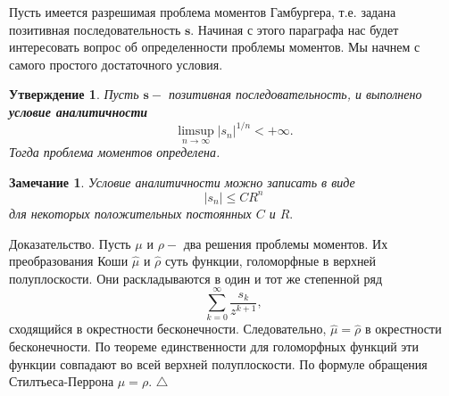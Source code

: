 \documentclass[12pt,a4paper]{article}
\theoremstyle{plain}   \newtheorem{Pro}{Задача}
\newtheorem{Sta}{Утверждение}
\newtheorem{Rem}{Замечание}
\begin{document}
Пусть имеется разрешимая проблема моментов Гамбургера, т.е.
задана позитивная последовательность
$ \mathbf{s} . $
Начиная с этого параграфа нас будет интересовать вопрос об
определенности проблемы моментов. Мы начнем с самого простого
достаточного условия.
\begin{Sta}
Пусть
$ \mathbf{s} - $
позитивная последовательность, и выполнено
{\bfseries условие аналитичности}
$$
  \limsup _{n \rightarrow \infty }
  |s_n |^{1/n} < + \infty .
$$
Тогда проблема моментов определена.
\end{Sta}
\begin{Rem}
Условие аналитичности можно записать в виде
$$
  |s_n | \leq CR^n
$$
для некоторых положительных постоянных
$ C $
и
$ R . $
\end{Rem}
{\Large Доказательство.}
Пусть
$ \mu $
и
$ \rho - $
два решения проблемы моментов. Их преобразования Коши
$ \hat \mu $
и
$ \hat \rho $
суть функции, голоморфные в верхней полуплоскости.
Они раскладываются в один и тот же степенной ряд
$$
  \sum _{k=0}^{\infty}\frac{s_k}{z^{k+1}},
$$
сходящийся в окрестности бесконечности. Следовательно,
$ \hat \mu = \hat \rho $
в окрестности бесконечности. По теореме
единственности для голоморфных функций
эти функции совпадают во всей верхней полуплоскости.
По формуле обращения Стилтьеса-Перрона
$ \mu = \rho .$
$ \triangle $
\\
\end{document}
